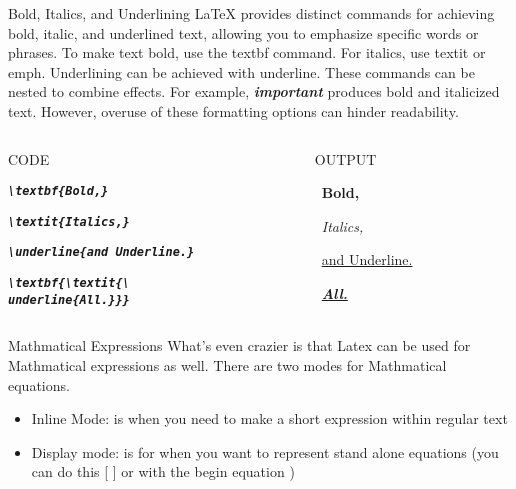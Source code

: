 \documentclass[pdf]{beamer}
\begin{document}
\begin{frame}{Bold, Italics, and Underlining}
    LaTeX provides distinct commands for achieving bold, italic, 
    and underlined text, allowing you to emphasize 
    specific words or phrases. To make text bold,
     use the textbf command. For italics, 
     use textit or emph. Underlining can be 
     achieved with underline. These commands 
     can be nested to combine effects. For example, \textbf{\textit{important}} 
     produces bold and italicized text. However, overuse
     of these formatting options can hinder readability.

     \begin{columns}
        \begin{column}{0.5\textwidth}
            \begin{center}
                CODE
            \end{center}
            \par \footnotesize{\textbf{\textit{\texttt{\textbackslash textbf\{Bold,\}}}}}
            \par \footnotesize{\textbf{\textit{\texttt{\textbackslash textit\{Italics,\}}}}}
            \par \footnotesize{\textbf{\textit{\texttt{\textbackslash underline\{and Underline.\}}}}}
            \par \footnotesize{\textbf{\textit{\texttt{\textbackslash textbf\{\textbackslash textit\{\textbackslash \\ underline\{All.\}\}\}}}}}
        \end{column}
        \vrule
        \begin{column}{0.5\textwidth}
            \begin{center}
                OUTPUT
            \end{center}
            \par \, \textbf{Bold,} 
            \par \, \textit{Italics,} 
            \par \, \underline{and Underline.}
            \par \, \textbf{\textit{\underline{All.}}}
        \end{column}
    \end{columns}
    
\end{frame}
\begin{frame}{Mathmatical Expressions}
        What's even crazier is that Latex can be used for Mathmatical expressions as well.
        There are two modes for Mathmatical equations.
        \begin{itemize}
            \item Inline Mode: is when you need to make a short expression within regular text
            \item Display mode: is for when you want to represent stand alone equations (you can do this [ ] or with the begin {equation} )
        \end{itemize}
\end{frame}
\end{document}
